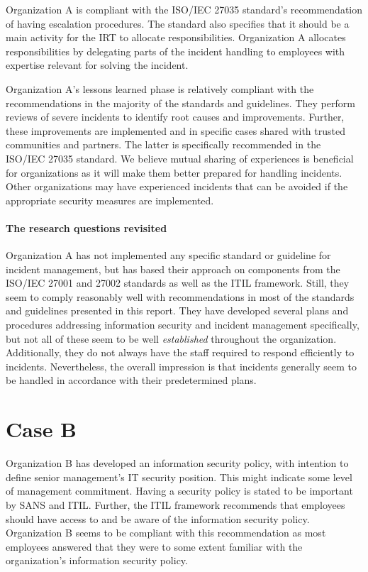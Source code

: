 Organization A is compliant with the ISO/IEC 27035 standard's recommendation of having escalation procedures. The standard also specifies that it should be a main activity for the \ac{IRT} to allocate responsibilities. Organization A allocates responsibilities by delegating parts of the incident handling to employees with expertise relevant for solving the incident.

Organization A's lessons learned phase is relatively compliant with the recommendations in the majority of the standards and guidelines. They perform reviews of severe incidents to identify root causes and improvements. Further, these improvements are implemented and in specific cases shared with trusted communities and partners. The latter is specifically recommended in the ISO/IEC 27035 standard. We believe mutual sharing of experiences is beneficial for organizations as it will make them better prepared for handling incidents. Other organizations may have experienced incidents that can be avoided if the appropriate security measures are implemented. 

\paragraph{The research questions revisited}
Organization A has not implemented any specific standard or guideline for incident management, but has based their approach on components from the ISO/IEC 27001 and 27002 standards as well as the \ac{ITIL} framework. Still, they seem to comply reasonably well with recommendations in most of the standards and guidelines presented in this report. They have developed several plans and procedures addressing information security and incident management specifically, but not all of these seem to be well \textit{established} throughout the organization. Additionally, they do not always have the staff required to respond efficiently to incidents. Nevertheless, the overall impression is that incidents generally seem to be handled in accordance with their predetermined plans.

\section{Case B}
\label{sec:discussionCaseB}
Organization B has developed an information security policy, with intention to define senior management's IT security position. This might indicate some level of management commitment. Having a security policy is stated to be important by SANS and ITIL. Further, the ITIL framework recommends that employees should have access to and be aware of the information security policy. Organization B seems to be compliant with this recommendation as most employees answered that they were to some extent familiar with the organization's information security policy. 

